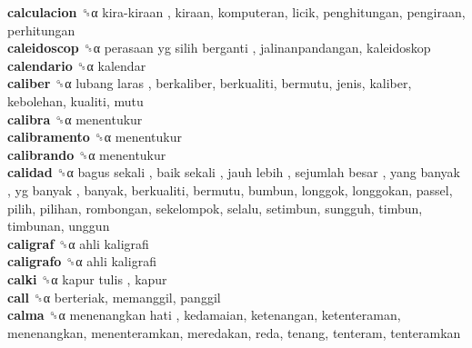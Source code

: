 \textbf{calculacion} ␝α   kira-kiraan , kiraan, komputeran, licik, penghitungan, pengiraan, perhitungan  \\
\textbf{caleidoscop} ␝α   perasaan yg silih berganti , jalinanpandangan, kaleidoskop  \\
\textbf{calendario} ␝α  kalendar  \\
\textbf{caliber} ␝α   lubang laras , berkaliber, berkualiti, bermutu, jenis, kaliber, kebolehan, kualiti, mutu  \\
\textbf{calibra} ␝α  menentukur  \\
\textbf{calibramento} ␝α  menentukur  \\
\textbf{calibrando} ␝α  menentukur  \\
\textbf{calidad} ␝α   bagus sekali ,  baik sekali ,  jauh lebih ,  sejumlah besar ,  yang banyak ,  yg banyak , banyak, berkualiti, bermutu, bumbun, longgok, longgokan, passel, pilih, pilihan, rombongan, sekelompok, selalu, setimbun, sungguh, timbun, timbunan, unggun  \\
\textbf{caligraf} ␝α   ahli kaligrafi   \\
\textbf{caligrafo} ␝α   ahli kaligrafi   \\
\textbf{calki} ␝α   kapur tulis , kapur  \\
\textbf{call} ␝α  berteriak, memanggil, panggil  \\
\textbf{calma} ␝α   menenangkan hati , kedamaian, ketenangan, ketenteraman, menenangkan, menenteramkan, meredakan, reda, tenang, tenteram, tenteramkan  \\
